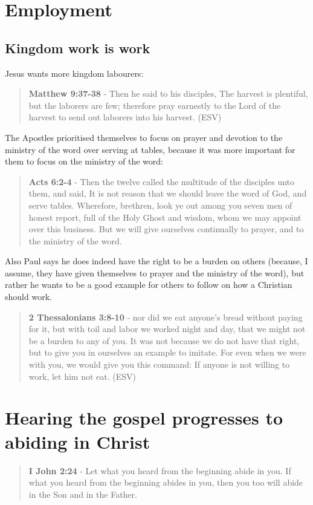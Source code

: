 \documentclass[11pt]{article}
\begin{document}
\section{Employment}
\label{sec:orgb0b12df}
\subsection{Kingdom work \textbf{is} work}
\label{sec:orgc851d61}
Jesus wants more kingdom labourers:

\begin{quote}
\textbf{Matthew 9:37-38} - Then he said to his disciples, The harvest is plentiful, but the laborers are few; therefore pray earnestly to the Lord of the harvest to send out laborers into his harvest. (ESV)
\end{quote}

The Apostles prioritised themselves to focus on prayer and devotion to the ministry of the word over serving at tables, because it was more important for them to focus on the ministry of the word:

\begin{quote}
\textbf{Acts 6:2-4} - Then the twelve called the multitude of the disciples unto them, and said, It is not reason that we should leave the word of God, and serve tables. Wherefore, brethren, look ye out among you seven men of honest report, full of the Holy Ghost and wisdom, whom we may appoint over this business. But we will give ourselves continually to prayer, and to the ministry of the word.
\end{quote}

Also Paul says he does indeed have the right to be a burden on others (because, I assume, they have given themselves to prayer and the ministry of the word), but rather he wants to be a good example for others to follow on how a Christian should work.

\begin{quote}
\textbf{2 Thessalonians 3:8-10} - nor did we eat anyone's bread without paying for it, but with toil and labor we worked night and day, that we might not be a burden to any of you. It was not because we do not have that right, but to give you in ourselves an example to imitate. For even when we were with you, we would give you this command: If anyone is not willing to work, let him not eat. (ESV)
\end{quote}

\section{Hearing the gospel progresses to abiding in Christ}
\label{sec:org99f65a0}
\begin{quote}
\textbf{I John 2:24} - Let what you heard from the beginning abide in you. If what you heard from the beginning abides in you, then you too will abide in the Son and in the Father.
\end{quote}
\end{document}
